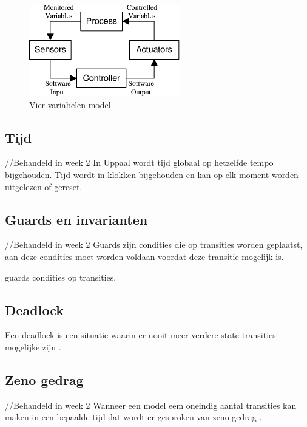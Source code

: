 \documentclass{article}
\begin{document}
\begin{figure}[!h]
	\centering
	\includegraphics[width=\textwidth]{four_Variables}
    \caption{Vier variabelen model \cite{thompson2000requirements}}
	\label{fig:four_Variables}
\end{figure}

\subsection{Tijd}
//Behandeld in week 2 \newline
In Uppaal wordt tijd globaal op hetzelfde tempo bijgehouden. Tijd wordt in klokken bijgehouden en kan op elk moment worden uitgelezen of gereset. \cite{uppaalsmalltutorial}
\subsection{Guards en invarianten}
//Behandeld in week 2 \newline 
Guards zijn condities die op transities worden geplaatst, aan deze condities moet worden voldaan voordat deze transitie mogelijk is.\cite{uppaalsmalltutorial}


guards condities op transities, 

\subsection{Deadlock}

Een deadlock is een situatie waarin er nooit meer verdere state transities mogelijke zijn \cite{uppaalintro}.

\subsection{Zeno gedrag}
//Behandeld in week 2
Wanneer een model eem oneindig aantal transities kan maken in een bepaalde tijd dat wordt er gesproken van zeno gedrag \cite{uppaaltutorialmodelingpatterns} \cite{leine2011zeno}.
\end{document}
